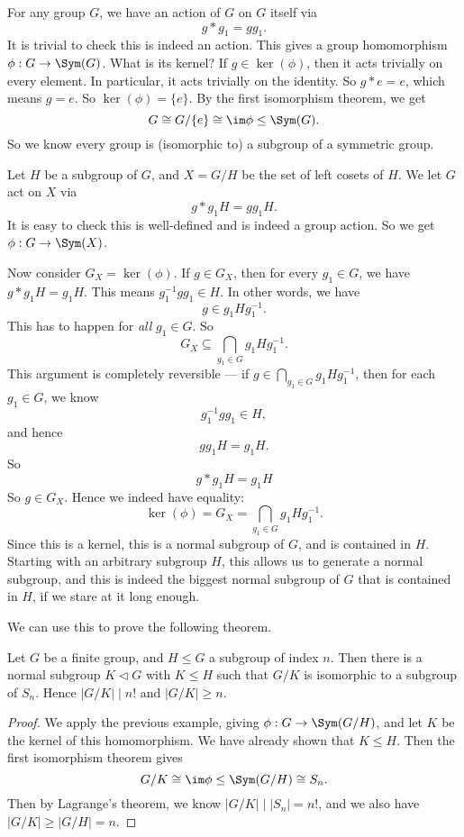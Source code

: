 \documentclass[a4paper]{article}
\begin{document}
\begin{eg}
  For any group $G$, we have an action of $G$ on $G$ itself via
  \[
    g * g_1 = gg_1.
  \]
  It is trivial to check this is indeed an action. This gives a group homomorphism $\phi: G \to \Sym(G)$. What is its kernel? If $g \in \ker(\phi)$, then it acts trivially on every element. In particular, it acts trivially on the identity. So $g* e = e$, which means $g = e$. So $\ker(\phi) = \{e\}$. By the first isomorphism theorem, we get
  \[
    G \cong G/\{e\} \cong \im \phi \leq \Sym(G).
  \]
  So we know every group is (isomorphic to) a subgroup of a symmetric group.
\end{eg}

\begin{eg}
  Let $H$ be a subgroup of $G$, and $X = G/H$ be the set of left cosets of $H$. We let $G$ act on $X$ via
  \[
    g* g_1 H = gg_1 H.
  \]
  It is easy to check this is well-defined and is indeed a group action. So we get $\phi: G \to \Sym(X)$.

  Now consider $G_X = \ker(\phi)$. If $g \in G_X$, then for every $g_1 \in G$, we have $g * g_1 H = g_1H$. This means $g_1^{-1} gg_1 \in H$. In other words, we have
  \[
    g \in g_1 H g_1^{-1}.
  \]
  This has to happen for \emph{all} $g_1 \in G$. So
  \[
    G_X \subseteq \bigcap_{g_1 \in G} g_1 Hg_1^{-1}.
  \]
  This argument is completely reversible --- if $g \in \bigcap_{g_1 \in G} g_1 Hg_1^{-1}$, then for each $g_1 \in G$, we know
  \[
    g_1^{-1}g g_1 \in H,
  \]
  and hence
  \[
    gg_1 H = g_1H.
  \]
  So
  \[
    g* g_1 H = g_1 H
  \]
  So $g \in G_X$. Hence we indeed have equality:
  \[
    \ker (\phi) = G_X = \bigcap_{g_1 \in G} g_1 Hg_1^{-1}.
  \]
  Since this is a kernel, this is a normal subgroup of $G$, and is contained in $H$. Starting with an arbitrary subgroup $H$, this allows us to generate a normal subgroup, and this is indeed the biggest normal subgroup of $G$ that is contained in $H$, if we stare at it long enough.
\end{eg}

We can use this to prove the following theorem.
\begin{thm}
  Let $G$ be a finite group, and $H \leq G$ a subgroup of index $n$. Then there is a normal subgroup $K \lhd G$ with $K \leq H$ such that $G/K$ is isomorphic to a subgroup of $S_n$. Hence $|G/K| \mid n!$ and $|G/K| \geq n$.
\end{thm}

\begin{proof}
  We apply the previous example, giving $\phi: G \to \Sym(G/H)$, and let $K$ be the kernel of this homomorphism. We have already shown that $K \leq H$. Then the first isomorphism theorem gives
  \[
    G/K \cong \im \phi \leq \Sym(G/H) \cong S_n.
  \]
  Then by Lagrange's theorem, we know $|G/K| \mid |S_n| = n!$, and we also have $|G/K| \geq |G/H| = n$.
\end{proof}
\end{document}
